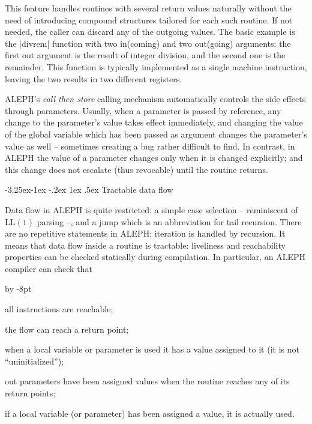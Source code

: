 \documentclass{article}
\makeatletter
\newcommand\A{{\sf ALEPH}}
\renewenvironment{itemize}{\begin{list}{}{%
\advance\leftmargin by -8pt%
\setlength\itemsep{0ex plus 0.2ex}%
\setlength\partopsep{3pt}%
\setlength\topsep{2pt plus 2pt}%
\setlength\parsep{0pt plus 2pt}%
}}{\end{list}}
\renewcommand\subsection{%
\@startsection{subsection}{2}{\z@}%
   {-3.25ex\@plus -1ex \@minus -.2ex}%
   {1ex \@plus .5ex}%
   {\normalfont\normalsize\bfseries}}
\makeatother
\begin{document}
This feature handles routines with several return values naturally without
the need of introducing compound structures tailored for each such routine.
If not needed, the caller can discard any of the outgoing values. The basic
example is the \pp|divrem| function with two in(coming) and two out(going) arguments: the
first out argument is the result of integer division, and the second one
is the remainder. This function is typically implemented as a single machine
instruction, leaving the two results in two different registers.

\A's \emph{call then store} calling mechanism automatically controls the
side effects through parameters. Usually, when a parameter is passed by reference,
any change to the parameter's value takes effect immediately, and changing
the value of the global variable which has been passed as argument changes
the parameter's value as well -- sometimes creating a bug rather difficult to
find. In contrast, in \A{} the value of a parameter changes only when it is changed explicitly;
and this change does not escalate (thus revocable) until the routine
returns.

\subsection{Tractable data flow}\label{subsec:flow}

Data flow in \A{} is quite restricted: a simple case selection -- reminiscent
of LL$(1)$ parsing --, and a jump which is an abbreviation for tail recursion.
There are no repetitive statements in \A; iteration is handled by recursion. It means
that data flow inside a routine is tractable: liveliness and
reachability properties can be checked statically during compilation. 
In particular, an \A{} compiler can check that
\begin{itemize}
\item[$\cdot$] all instructions are reachable;
\item[$\cdot$] the flow can reach a return point;
\item[$\cdot$] when a local variable or parameter is used it has a value assigned to it
 (it is not ``uninitialized'');
\item[$\cdot$] out parameters have been assigned values when the routine reaches any of
its return points;
\item[$\cdot$] if a local variable (or parameter) has been assigned a value, it is actually used.
\end{itemize}
\end{document}
